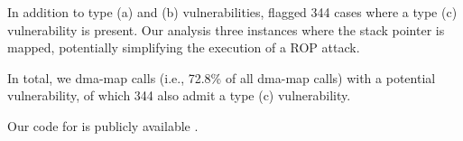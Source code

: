 In addition to type (a) and (b) vulnerabilities, \tool \DIFdelbegin {}\DIFdelend \DIFaddbegin {}\DIFaddend flagged 344 cases where a type (c) vulnerability is present. Our analysis \DIFdelbegin {}\DIFdelend \DIFaddbegin {}\DIFaddend three instances where the stack pointer is mapped, potentially simplifying the execution of a ROP attack.

In total, we \DIFdelbegin {}\DIFdelend \DIFaddbegin {} dma-map calls (i.e., 72.8\% of all dma-map calls) with a potential vulnerability, of which 344 also admit a type (c) vulnerability.

Our code for \tool is publicly available \cite{SPADE}.







